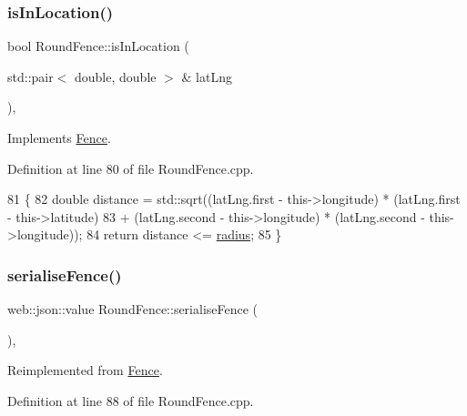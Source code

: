 \subsubsection{\texorpdfstring{is\+In\+Location()}{isInLocation()}}
{\footnotesize\ttfamily bool Round\+Fence\+::is\+In\+Location (\begin{DoxyParamCaption}\item[{std\+::pair$<$ double, double $>$ \&}]{lat\+Lng }\end{DoxyParamCaption})\hspace{0.3cm}{\ttfamily [override]}, {\ttfamily [virtual]}}



Implements \hyperlink{class_fence_a80fb7fbb60592d3e8afc0ecb5122b987}{Fence}.



Definition at line 80 of file Round\+Fence.\+cpp.


\begin{DoxyCode}
81 \{
82     \textcolor{keywordtype}{double} distance = std::sqrt((latLng.first - this->longitude) * (latLng.first - this->latitude)
83                                 + (latLng.second - this->longitude) * (latLng.second - this->longitude));
84     \textcolor{keywordflow}{return} distance <= \hyperlink{class_round_fence_a8e9d1a2f22df0bb718522f3ab6cd3b83}{radius};
85 \}
\end{DoxyCode}
\mbox{\label{class_round_fence_ae9dd3e4291f7509ce557a6c28cdd682d}} 
\subsubsection{\texorpdfstring{serialise\+Fence()}{serialiseFence()}}
{\footnotesize\ttfamily web\+::json\+::value Round\+Fence\+::serialise\+Fence (\begin{DoxyParamCaption}{ }\end{DoxyParamCaption})\hspace{0.3cm}{\ttfamily [override]}, {\ttfamily [virtual]}}



Reimplemented from \hyperlink{class_fence_a5c8529e80a4444cc9ca0fb660cbf07c8}{Fence}.



Definition at line 88 of file Round\+Fence.\+cpp.


